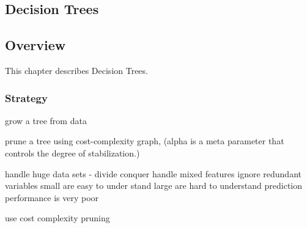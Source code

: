 

\renewcommand{\bibsection}{\subsection{\bibname}}
\begin{bibunit}

\chapter{Decision Trees}
\label{ch:trees}

\section{Overview}
This chapter describes Decision Trees.


\subsection{Strategy}

grow a tree from data

prune a tree using cost-complexity graph, (alpha is a meta parameter that controls the degree of stabilization.)

handle huge data sets - divide conquer 
handle mixed features
ignore redundant variables
small are easy to under stand
large are hard to understand
prediction performance is very poor

use cost complexity pruning



\end{bibunit}
